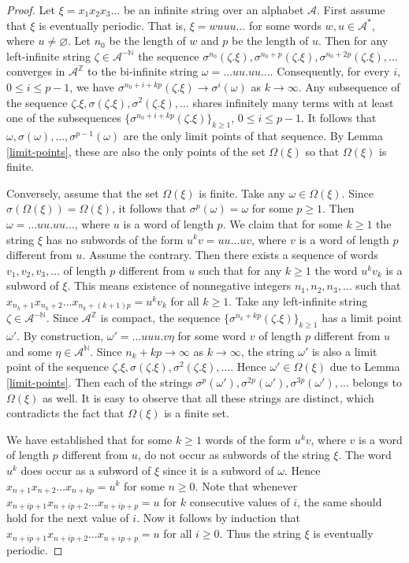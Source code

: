 \documentclass[12pt]{article}
\theoremstyle{definition}
\def\bN{\mathbb{N}}
\def\bZ{\mathbb{Z}}
\def\cA{\mathcal{A}}
\def\om{\omega}
\def\si{\sigma}
\def\Om{\Omega}
\begin{document}
\begin{proof}
Let $\xi=x_1x_2x_3\ldots$ be an infinite string over an alphabet $\cA$.  
First assume that $\xi$ is eventually periodic.  That is, $\xi=wuuu\ldots$ 
for some words $w,u\in\cA^*$, where $u\ne\varnothing$.  Let $n_0$ be the 
length of $w$ and $p$ be the length of $u$.  Then for any left-infinite 
string $\zeta\in\cA^{-\bN}$ the sequence 
$\si^{n_0}(\zeta.\xi),\si^{n_0+p}(\zeta.\xi),\si^{n_0+2p}(\zeta.\xi),\dots$ 
converges in $\cA^{\bZ}$ to the bi-infinite string $\om=\ldots 
uu.uu\ldots$.  Consequently, for every $i$, $0\le i\le p-1$, we have 
$\si^{n_0+i+kp}(\zeta.\xi)\to\si^i(\om)$ as $k\to\infty$.  Any subsequence 
of the sequence $\zeta.\xi,\si(\zeta.\xi),\si^2(\zeta.\xi),\dots$ shares 
infinitely many terms with at least one of the subsequences
$\{\si^{n_0+i+kp}(\zeta.\xi)\}_{k\ge1}$, $0\le i\le p-1$.  It follows that 
$\om,\si(\om),\dots,\si^{p-1}(\om)$ are the only limit points of that 
sequence.  By Lemma \ref{limit-points}, these are also the only points of 
the set $\Om(\xi)$ so that $\Om(\xi)$ is finite.

Conversely, assume that the set $\Om(\xi)$ is finite.  Take any 
$\om\in\Om(\xi)$.  Since $\si(\Om(\xi))=\Om(\xi)$, it follows that 
$\si^p(\om)=\om$ for some $p\ge1$.  Then $\om=\ldots uu.uu\ldots$, where 
$u$ is a word of length $p$.  We claim that for some $k\ge1$ the string 
$\xi$ has no subwords of the form $u^kv=uu\ldots uv$, where $v$ is a word 
of length $p$ different from $u$.  Assume the contrary.  Then there exists 
a sequence of words $v_1,v_2,v_3,\dots$ of length $p$ different from $u$ 
such that for any $k\ge1$ the word $u^kv_k$ is a subword of $\xi$.  This 
means existence of nonnegative integers $n_1,n_2,n_3,\dots$ such that 
$x_{n_k+1}x_{n_k+2}\ldots x_{n_k+(k+1)p}=u^kv_k$ for all $k\ge1$.  Take 
any left-infinite string $\zeta\in\cA^{-\bN}$.  Since $\cA^{\bZ}$ is 
compact, the sequence $\{\si^{n_k+kp}(\zeta.\xi)\}_{k\ge1}$ has a limit 
point $\om'$.  By construction, $\om'=\ldots uuu.v\eta$ for some word $v$ 
of length $p$ different from $u$ and some $\eta\in\cA^{\bN}$.  Since 
$n_k+kp\to\infty$ as $k\to\infty$, the string $\om'$ is also a limit point 
of the sequence $\zeta.\xi,\si(\zeta.\xi),\si^2(\zeta.\xi),\dots$.  Hence 
$\om'\in\Om(\xi)$ due to Lemma \ref{limit-points}.  Then each of the  
strings $\si^p(\om'),\si^{2p}(\om'),\si^{3p}(\om'),\dots$ belongs to 
$\Om(\xi)$ as well.  It is easy to observe that all these strings are 
distinct, which contradicts the fact that $\Om(\xi)$ is a finite set.

We have established that for some $k\ge1$ words of the form $u^kv$, where 
$v$ is a word of length $p$ different from $u$, do not occur as subwords of 
the string $\xi$.  The word $u^k$ does occur as a subword of $\xi$ since it 
is a subword of $\om$.  Hence $x_{n+1}x_{n+2}\ldots x_{n+kp}=u^k$ for some 
$n\ge0$.  Note that whenever $x_{n+ip+1}x_{n+ip+2}\ldots x_{n+ip+p}=u$ for 
$k$ consecutive values of $i$, the same should hold for the next value of 
$i$.  Now it follows by induction that $x_{n+ip+1}x_{n+ip+2}\ldots 
x_{n+ip+p}=u$ for all $i\ge0$.  Thus the string $\xi$ is eventually 
periodic.
\end{proof}
\end{document}
